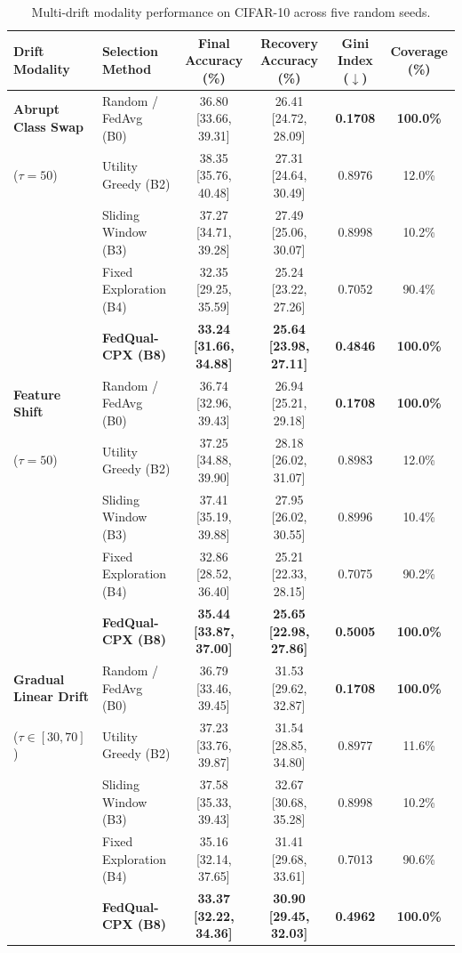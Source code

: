 \documentclass[conference]{IEEEtran}
\begin{document}
\begin{table}[t]
\caption{Multi-drift modality performance on CIFAR-10 across five random seeds.}
\label{tab:multi_drift}
\centering
\begin{tabular}{llcccc}
\toprule
\textbf{Drift Modality} & \textbf{Selection Method} & \textbf{Final Accuracy (\%)} & \textbf{Recovery Accuracy (\%)} & \textbf{Gini Index ($\downarrow$)} & \textbf{Coverage (\%)} \\
\midrule
\textbf{Abrupt Class Swap} & Random / FedAvg (B0) & 36.80 [33.66, 39.31] & 26.41 [24.72, 28.09] & \textbf{0.1708} & \textbf{100.0\%} \\
($\tau=50$) & Utility Greedy (B2) & 38.35 [35.76, 40.48] & 27.31 [24.64, 30.49] & 0.8976 & 12.0\% \\
& Sliding Window (B3) & 37.27 [34.71, 39.28] & 27.49 [25.06, 30.07] & 0.8998 & 10.2\% \\
& Fixed Exploration (B4) & 32.35 [29.25, 35.59] & 25.24 [23.22, 27.26] & 0.7052 & 90.4\% \\
& \textbf{FedQual-CPX (B8)} & \textbf{33.24 [31.66, 34.88]} & \textbf{25.64 [23.98, 27.11]} & \textbf{0.4846} & \textbf{100.0\%} \\
\midrule
\textbf{Feature Shift} & Random / FedAvg (B0) & 36.74 [32.96, 39.43] & 26.94 [25.21, 29.18] & \textbf{0.1708} & \textbf{100.0\%} \\
($\tau=50$) & Utility Greedy (B2) & 37.25 [34.88, 39.90] & 28.18 [26.02, 31.07] & 0.8983 & 12.0\% \\
& Sliding Window (B3) & 37.41 [35.19, 39.88] & 27.95 [26.02, 30.55] & 0.8996 & 10.4\% \\
& Fixed Exploration (B4) & 32.86 [28.52, 36.40] & 25.21 [22.33, 28.15] & 0.7075 & 90.2\% \\
& \textbf{FedQual-CPX (B8)} & \textbf{35.44 [33.87, 37.00]} & \textbf{25.65 [22.98, 27.86]} & \textbf{0.5005} & \textbf{100.0\%} \\
\midrule
\textbf{Gradual Linear Drift} & Random / FedAvg (B0) & 36.79 [33.46, 39.45] & 31.53 [29.62, 32.87] & \textbf{0.1708} & \textbf{100.0\%} \\
($\tau \in [30, 70]$) & Utility Greedy (B2) & 37.23 [33.76, 39.87] & 31.54 [28.85, 34.80] & 0.8977 & 11.6\% \\
& Sliding Window (B3) & 37.58 [35.33, 39.43] & 32.67 [30.68, 35.28] & 0.8998 & 10.2\% \\
& Fixed Exploration (B4) & 35.16 [32.14, 37.65] & 31.41 [29.68, 33.61] & 0.7013 & 90.6\% \\
& \textbf{FedQual-CPX (B8)} & \textbf{33.37 [32.22, 34.36]} & \textbf{30.90 [29.45, 32.03]} & \textbf{0.4962} & \textbf{100.0\%} \\
\bottomrule
\end{tabular}
\end{table}
\end{document}
